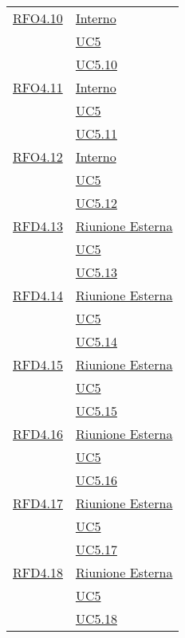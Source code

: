 \begin{longtable}{|>{\centering}m{5cm}|m{5cm}<{\centering}|}
\hyperlink{RFO4.10}{RFO4.10} & \hyperlink{Interno}{Interno}\\ &\hyperref[UC5]{UC5}\\  &\hyperref[UC5.10]{UC5.10}\\ \hline

\hyperlink{RFO4.11}{RFO4.11} &  \hyperlink{Interno}{Interno}\\ &\hyperref[UC5]{UC5}\\ &\hyperref[UC5.11]{UC5.11}\\ \hline

\hyperlink{RFO4.12}{RFO4.12} &  \hyperlink{Interno}{Interno}\\ &\hyperref[UC5]{UC5}\\ &\hyperref[UC5.12]{UC5.12}\\ \hline

\hyperlink{RFD4.13}{RFD4.13} & \hyperlink{Riunione Esterna}{Riunione Esterna}\\ &\hyperref[UC5]{UC5}\\ &\hyperref[UC5.13]{UC5.13}\\ \hline

\hyperlink{RFD4.14}{RFD4.14} & \hyperlink{Riunione Esterna}{Riunione Esterna}\\ &\hyperref[UC5]{UC5}\\ &\hyperref[UC5.14]{UC5.14}\\ \hline

\hyperlink{RFD4.15}{RFD4.15} & \hyperlink{Riunione Esterna}{Riunione Esterna}\\ &\hyperref[UC5]{UC5}\\ &\hyperref[UC5.15]{UC5.15}\\ \hline

\hyperlink{RFD4.16}{RFD4.16} &  \hyperlink{Riunione Esterna}{Riunione Esterna}\\ &\hyperref[UC5]{UC5}\\ &\hyperref[UC5.16]{UC5.16}\\ \hline

\hyperlink{RFD4.17}{RFD4.17} &  \hyperlink{Riunione Esterna}{Riunione Esterna}\\ &\hyperref[UC5]{UC5}\\  &\hyperref[UC5.17]{UC5.17}\\ \hline

\hyperlink{RFD4.18}{RFD4.18} & \hyperlink{Riunione Esterna}{Riunione Esterna}\\ &\hyperref[UC5]{UC5}\\ &\hyperref[UC5.18]{UC5.18}\\ \hline


\end{longtable}
